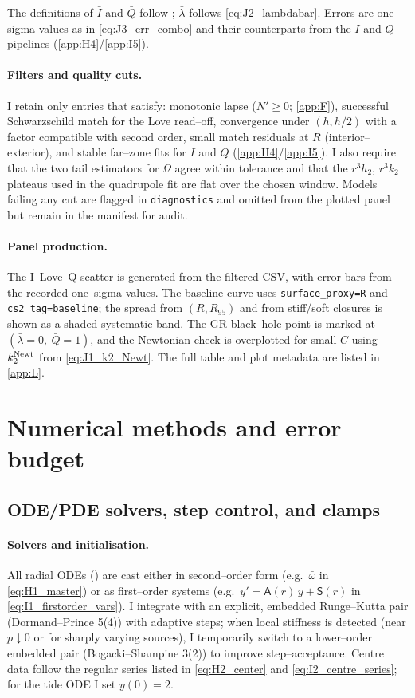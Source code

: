 \documentclass{iopjournal}
\begin{document}
The definitions of $\bar{I}$ and $\bar{Q}$ follow ; $\bar\lambda$ follows \eqref{eq:J2_lambdabar}. Errors are one–sigma values as in \eqref{eq:J3_err_combo} and their counterparts from the $I$ and $Q$ pipelines (\cref{app:H4}/\cref{app:I5}).

\paragraph{Filters and quality cuts.}
I retain only entries that satisfy: monotonic lapse ($N'\!\ge0$; \cref{app:F}), successful Schwarzschild match for the Love read–off, convergence under $(h,h/2)$ with a factor compatible with second order, small match residuals at $R$ (interior–exterior), and stable far–zone fits for $I$ and $Q$ (\cref{app:H4}/\cref{app:I5}). I also require that the two tail estimators for $\Omega$ agree within tolerance and that the $r^{3}h_2$, $r^{3}k_2$ plateaus used in the quadrupole fit are flat over the chosen window. Models failing any cut are flagged in \texttt{diagnostics} and omitted from the plotted panel but remain in the manifest for audit.

\paragraph{Panel production.}
The I–Love–Q scatter is generated from the filtered CSV, with error bars from the recorded one–sigma values. The baseline curve uses \texttt{surface\_proxy=R} and \texttt{cs2\_tag=baseline}; the spread from $(R,R_{95})$ and from stiff/soft closures is shown as a shaded systematic band. The GR black–hole point is marked at $(\bar\lambda=0,\ \bar{Q}=1)$, and the Newtonian check is overplotted for small $C$ using $k_2^{\rm Newt}$ from \eqref{eq:J1_k2_Newt}. The full table and plot metadata are listed in \cref{app:L}.

\section{Numerical methods and error budget}\label{app:K}

\subsection{ODE/PDE solvers, step control, and clamps}\label{app:K1}
\paragraph{Solvers and initialisation.}
All radial ODEs () are cast either in second–order form (e.g.\ $\bar\omega$ in \eqref{eq:H1_master}) or as first–order systems (e.g.\ $y'=\mathsf A(r)\,y+\mathsf S(r)$ in \eqref{eq:I1_firstorder_vars}). I integrate with an explicit, embedded Runge–Kutta pair (Dormand–Prince 5(4)) with adaptive steps; when local stiffness is detected (near $p\!\downarrow\!0$ or for sharply varying sources), I temporarily switch to a lower–order embedded pair (Bogacki–Shampine 3(2)) to improve step–acceptance. Centre data follow the regular series listed in \eqref{eq:H2_center} and \eqref{eq:I2_centre_series}; for the tide ODE I set $y(0)=2$.
\end{document}
